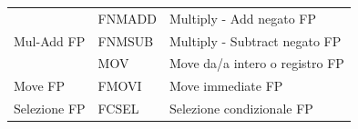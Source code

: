 \documentclass[12pt,a4paper]{article}
\begin{document}
\begin{longtable}{|l|l|l|}
                                                                                      & FNMADD                                               & Multiply - Add negato FP                                \\ \cline{2-3} 
\multirow{-4}{*}{Mul-Add FP}                                                          & FNMSUB                                               & Multiply - Subtract negato FP                           \\ \hline
                                                                                      & MOV                                                  & Move da/a intero o registro FP                          \\ \cline{2-3} 
\multirow{-2}{*}{Move FP}                                                             & FMOVI                                                & Move immediate FP                                       \\ \hline
Selezione FP                                                                          & FCSEL                                                & Selezione condizionale FP                               \\ \hline
\end{longtable}

\clearpage
\end{document}

